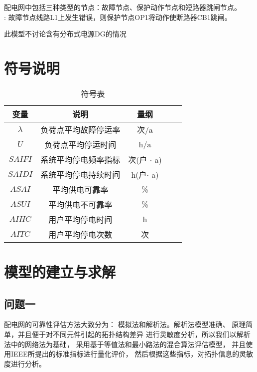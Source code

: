 \documentclass[withoutpreface,bwprint]{cumcmthesis} %
\begin{document}
\begin{assumption}
    配电网中包括三种类型的节点：故障节点、保护动作节点和短路器跳闸节点。\\
    : 故障节点线路L1上发生错误，则保护节点OP1将动作使断路器CB1跳闸。
\end{assumption}

\begin{assumption}
    此模型不讨论含有分布式电源DG的情况
\end{assumption}

\section{符号说明}
\begin{table}[!htbp]
    \caption{符号表}\label{tab:001} \centering
    \begin{tabular}{ccccc}
        \toprule[1.5pt]
        变量 & 说明 & 量纲 \\
        \midrule[1pt]
        $\lambda$ & 负荷点平均故障停运率 & 次/a \\
        $U$ & 负荷点平均停运时间 & h/a \\
        $SAIFI$ & 系统平均停电频率指标 & 次(户 $\cdot$ a) \\
        $SAIDI$ & 系统平均停电持续时间 & h(户$\cdot$ a) \\
        $ASAI$ & 平均供电可靠率 & \% \\
        $ASUI$ & 平均供电不可靠率 & \% \\
        $AIHC$ & 用户平均停电时间 & h \\
        $AITC$ & 用户平均停电次数 & 次 \\
        \bottomrule[1.5pt]
    \end{tabular}
\end{table}

\section{模型的建立与求解}
\subsection{问题一}
配电网的可靠性评估方法大致分为：
模拟法和解析法\cite{yy1}。解析法模型准确、
原理简单，并且便于对不同元件引起的拓扑结构差异
进行灵敏度分析，所以我们以解析法中的网络法为基础，
采用基于等值法和最小路法的混合算法评估模型\cite{yy2}，
并且使用IEEE所提出的标准指标进行量化评价，
然后根据这些指标，对拓扑信息的灵敏度进行分析。
\end{document}
